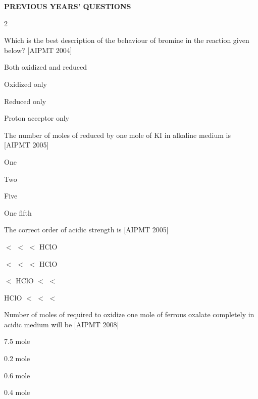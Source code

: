 \documentclass[10pt,a4paper]{article}
\begin{document}
\begin{mdframed}[backgroundcolor=sectionbg, linewidth=0pt, innerleftmargin=6pt, innerrightmargin=6pt, innertopmargin=4pt, innerbottommargin=4pt]
\color{white}\bfseries\small\centering PREVIOUS YEARS' QUESTIONS
\end{mdframed}

\begin{multicols}{2}
\begin{questions}[start=1]

\item Which is the best description of the behaviour of bromine in the reaction given below? \hfill [AIPMT 2004]\\
\begin{options}
  \item Both oxidized and reduced
  \item Oxidized only
  \item Reduced only
  \item Proton acceptor only
\end{options}

\item The number of moles of  reduced by one mole of KI in alkaline medium is \hfill [AIPMT 2005]
\begin{options}
  \item One
  \item Two
  \item Five
  \item One fifth
\end{options}

\item The correct order of acidic strength is \hfill [AIPMT 2005]
\begin{options}
  \item {} $<$  $<$  $<$ HClO
  \item {} $<$  $<$  $<$ HClO
  \item {} $<$ HClO $<$  $<$ 
  \item HClO $<$  $<$  $<$ 
\end{options}

\item Number of moles of  required to oxidize one mole of ferrous oxalate completely in acidic medium will be \hfill [AIPMT 2008]
\begin{options}
  \item 7.5 mole
  \item 0.2 mole
  \item 0.6 mole
  \item 0.4 mole
\end{options}


\end{questions}
\end{multicols}
\end{document}
